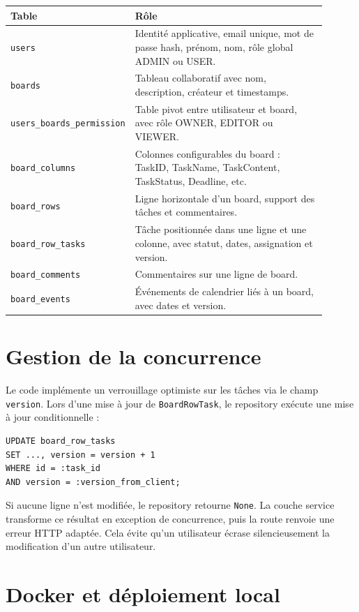 \documentclass[a4paper,11pt]{article}
\begin{document}
\begin{longtable}{p{0.25\linewidth}p{0.65\linewidth}}
\toprule
\textbf{Table} & \textbf{Rôle} \\
\midrule
\texttt{users} & Identité applicative, email unique, mot de passe hash, prénom, nom, rôle global ADMIN ou USER. \\
\texttt{boards} & Tableau collaboratif avec nom, description, créateur et timestamps. \\
\texttt{users\_boards\_permission} & Table pivot entre utilisateur et board, avec rôle OWNER, EDITOR ou VIEWER. \\
\texttt{board\_columns} & Colonnes configurables du board : TaskID, TaskName, TaskContent, TaskStatus, Deadline, etc. \\
\texttt{board\_rows} & Ligne horizontale d'un board, support des tâches et commentaires. \\
\texttt{board\_row\_tasks} & Tâche positionnée dans une ligne et une colonne, avec statut, dates, assignation et version. \\
\texttt{board\_comments} & Commentaires sur une ligne de board. \\
\texttt{board\_events} & Événements de calendrier liés à un board, avec dates et version. \\
\bottomrule
\end{longtable}

\section{Gestion de la concurrence}

Le code implémente un verrouillage optimiste sur les tâches via le champ \texttt{version}. Lors d'une mise à jour de \texttt{BoardRowTask}, le repository exécute une mise à jour conditionnelle :

\begin{lstlisting}[caption={Principe du verrouillage optimiste}]
UPDATE board_row_tasks
SET ..., version = version + 1
WHERE id = :task_id
AND version = :version_from_client;
\end{lstlisting}

Si aucune ligne n'est modifiée, le repository retourne \texttt{None}. La couche service transforme ce résultat en exception de concurrence, puis la route renvoie une erreur HTTP adaptée. Cela évite qu'un utilisateur écrase silencieusement la modification d'un autre utilisateur.

\section{Docker et déploiement local}
\end{document}
